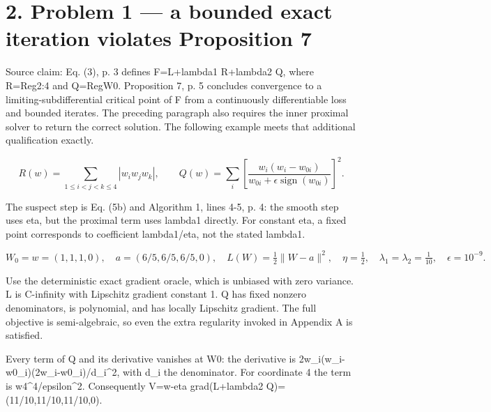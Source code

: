 \documentclass[10pt]{article}
\begin{document}
\section*{2. Problem 1 — a bounded exact iteration violates Proposition 7}
Source claim: Eq. (3), p. 3 defines F=L+lambda1 R+lambda2 Q, where R=Reg2:4 and Q=RegW0. Proposition 7, p. 5 concludes convergence to a limiting-subdifferential critical point of F from a continuously differentiable loss and bounded iterates. The preceding paragraph also requires the inner proximal solver to return the correct solution. The following example meets that additional qualification exactly.\par
\[R(w)=\sum_{1\le i<j<k\le4}|w_iw_jw_k|,\qquad Q(w)=\sum_i\left[\frac{w_i(w_i-w_{0i})}{w_{0i}+\epsilon\operatorname{sign}(w_{0i})}\right]^2.\]\par
The suspect step is Eq. (5b) and Algorithm 1, lines 4-5, p. 4: the smooth step uses eta, but the proximal term uses lambda1 directly. For constant eta, a fixed point corresponds to coefficient lambda1/eta, not the stated lambda1.\par
\[W_0=w=(1,1,1,0),\quad a=(6/5,6/5,6/5,0),\quad L(W)=\tfrac12\|W-a\|^2,\quad \eta=\tfrac12,\quad\lambda_1=\lambda_2=\tfrac1{10},\quad\epsilon=10^{-9}.\]\par
Use the deterministic exact gradient oracle, which is unbiased with zero variance. L is C-infinity with Lipschitz gradient constant 1. Q has fixed nonzero denominators, is polynomial, and has locally Lipschitz gradient. The full objective is semi-algebraic, so even the extra regularity invoked in Appendix A is satisfied.\par
Every term of Q and its derivative vanishes at W0: the derivative is 2w\_i(w\_i-w0\_i)(2w\_i-w0\_i)/d\_i\textasciicircum{}2, with d\_i the denominator. For coordinate 4 the term is w4\textasciicircum{}4/epsilon\textasciicircum{}2. Consequently V=w-eta grad(L+lambda2 Q)=(11/10,11/10,11/10,0).\par
\end{document}

